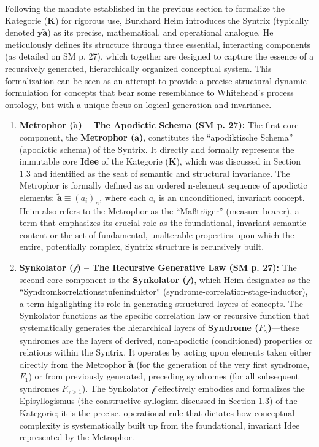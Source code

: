 \documentclass[12pt]{article}
\newcommand{\q}[1]{\enquote{#1}}
\newcommand{\kategorie}{\bm{K}}
\newcommand{\syntrix}{\bm{y\widetilde{a}}}
\newcommand{\metrophor}{\bm{\widetilde{a}}}
\newcommand{\synkolator}{\mathcal{f}}
\newcommand{\syndrom}{F}
\begin{document}
Following the mandate established in the previous section to formalize the Kategorie (\(\kategorie\)) for rigorous use, Burkhard Heim introduces the Syntrix (typically denoted \( \syntrix \)) as its precise, mathematical, and operational analogue. He meticulously defines its structure through three essential, interacting components (as detailed on SM p. 27), which together are designed to capture the essence of a recursively generated, hierarchically organized conceptual system. This formalization can be seen as an attempt to provide a precise structural-dynamic formulation for concepts that bear some resemblance to Whitehead's process ontology, but with a unique focus on logical generation and invariance.

\begin{enumerate}
    \item \textbf{Metrophor (\( \metrophor \)) – The Apodictic Schema (SM p. 27):}
    The first core component, the \textbf{Metrophor (\( \metrophor \))}, constitutes the \q{apodiktische Schema} (apodictic schema) of the Syntrix. It directly and formally represents the immutable core \textbf{Idee} of the Kategorie (\(\kategorie\)), which was discussed in Section 1.3 and identified as the seat of semantic and structural invariance. The Metrophor is formally defined as an ordered n-element sequence of apodictic elements: \( \metrophor \equiv (a_i)_n \), where each \(a_i\) is an unconditioned, invariant concept. Heim also refers to the Metrophor as the \q{Maßträger} (measure bearer), a term that emphasizes its crucial role as the foundational, invariant semantic content or the set of fundamental, unalterable properties upon which the entire, potentially complex, Syntrix structure is recursively built.

    \item \textbf{Synkolator (\( \synkolator \)) – The Recursive Generative Law (SM p. 27):}
    The second core component is the \textbf{Synkolator (\( \synkolator \))}, which Heim designates as the \q{Syndromkorrelationsstufeninduktor} (syndrome-correlation-stage-inductor), a term highlighting its role in generating structured layers of concepts. The Synkolator functions as the specific correlation law or recursive function that systematically generates the hierarchical layers of \textbf{Syndrome (\( \syndrom_\gamma \))}—these syndromes are the layers of derived, non-apodictic (conditioned) properties or relations within the Syntrix. It operates by acting upon elements taken either directly from the Metrophor \( \metrophor \) (for the generation of the very first syndrome, \( \syndrom_1 \)) or from previously generated, preceding syndromes (for all subsequent syndromes \( \syndrom_{\gamma>1} \)). The Synkolator \( \synkolator \) effectively embodies and formalizes the Episyllogismus (the constructive syllogism discussed in Section 1.3) of the Kategorie; it is the precise, operational rule that dictates how conceptual complexity is systematically built up from the foundational, invariant Idee represented by the Metrophor.


\end{enumerate}
\end{document}
